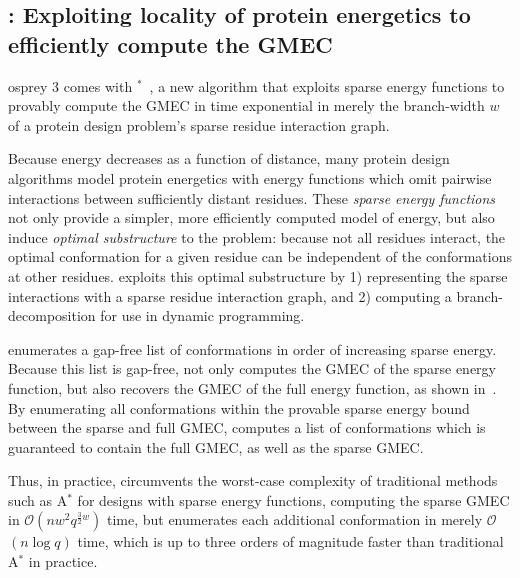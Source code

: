 \def\Oh{$\mathcal{O}$}
\subsection{\bwmstar: Exploiting locality of protein energetics to efficiently compute the GMEC}


{\sc osprey} 3 comes with \bwmstar$^*$~\cite{BWM_JCB}, a new algorithm that exploits sparse energy functions to provably compute the GMEC in time exponential in merely the branch-width $w$ of a protein design problem's sparse residue interaction graph.

Because energy decreases as a function of distance, many protein design algorithms model protein energetics with energy functions which omit pairwise interactions between sufficiently distant residues. These \emph{sparse energy functions} not only provide a simpler, more efficiently computed model of energy, but also induce \emph{optimal substructure} to the problem: because not all residues interact, the optimal conformation for a given residue can be independent of the conformations at other residues. \bwmstar exploits this optimal substructure by 1) representing the sparse interactions with a sparse residue interaction graph, and 2) computing a branch-decomposition for use in dynamic programming. 

\bwmstar enumerates a gap-free list of conformations in order of increasing sparse energy. Because this list is gap-free, \bwmstar not only computes the GMEC of the sparse energy function, but also recovers the GMEC of the full energy function, as shown in~\cite{BWM_JCB}. By enumerating all conformations within the provable sparse energy bound between the sparse and full GMEC, \bwmstar computes a list of conformations which is guaranteed to contain the full GMEC, as well as the sparse GMEC.

Thus, in practice, \bwmstar circumvents the worst-case complexity of traditional methods such as A$^*$ for designs with sparse energy functions, computing the sparse GMEC in \Oh$(nw^2q^{\frac{3}{2}w})$ time, but enumerates each additional conformation in merely \Oh$(n\log q)$ time, which is up to three orders of magnitude faster than traditional A$^*$ in practice.